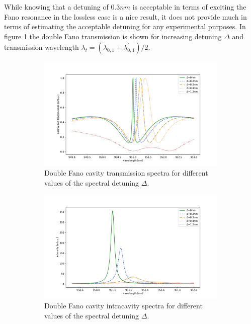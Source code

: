 While knowing that a detuning of $0.3nm$ is acceptable in terms of exciting the Fano resonance in the lossless case is a nice result, it does not provide much in terms of estimating the acceptable detuning for any experimental purposes. In figure \ref{fig:detuning_scan} the double Fano transmission is shown for increasing detuning $\Delta$ and transmission wavelength $\lambda_t = (\lambda_{0,1} + \lambda_{0,1}^{\prime})/2$. 

\begin{figure}[h!]
    \centering
    \begin{subfigure}[b]{0.49\textwidth}
        \includegraphics[width=\textwidth]{figures/detuning_scan_double_fano_30um.pdf}
        \caption{Double Fano cavity transmission spectra for different values of the spectral detuning $\Delta$.}
        \label{fig:detuning_scan}
    \end{subfigure}
    \begin{subfigure}[b]{0.49\textwidth}
        \includegraphics[width=\textwidth]{figures/detuning_scan_intracavity_double_fano_30um.pdf}
        \caption{Double Fano cavity intracavity spectra for different values of the spectral detuning $\Delta$.}
        \label{fig:intracavity_detuning_scan}
    \end{subfigure}
    \caption{}
    \label{fig:detuning_threshold_lossless}
\end{figure}

